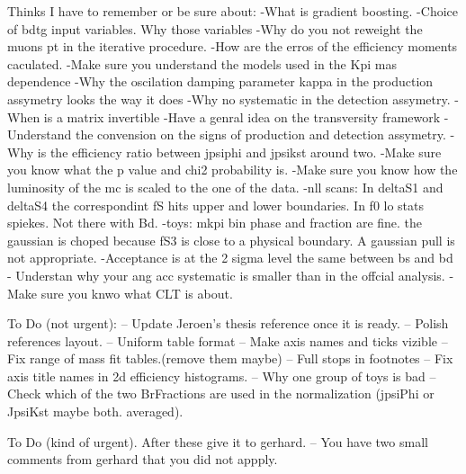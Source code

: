 
Thinks I have to remember or be sure about:
-What is gradient boosting.
-Choice of bdtg input variables. Why those variables
-Why do you not reweight the muons pt in the iterative procedure.
-How are the erros of the efficiency moments caculated.
-Make sure you understand the models used in the Kpi mas dependence
-Why the oscilation damping parameter kappa in the production assymetry looks the way it does 
-Why no systematic in the detection assymetry.
-When is a matrix invertible
-Have a genral idea on the transversity framework
-Understand the convension on the signs of production and detection assymetry.
-Why is the efficiency ratio between jpsiphi and jpsikst around two.
-Make sure you know what the p value and chi2 probability is.
-Make sure you know how the luminosity of the mc is scaled to the one of the data.
-nll scans: 
    In deltaS1 and deltaS4 the correspondint fS hits upper and lower boundaries.
    In f0 lo stats spiekes. Not there with Bd. 
-toys:
    mkpi bin phase and fraction are fine. the gaussian is choped because fS3 is close to a physical boundary. A gaussian pull is not appropriate.
-Acceptance is at the 2 sigma level the same between bs and bd
- Understan why your ang acc systematic is smaller than in the offcial analysis.
- Make sure you knwo what CLT is about.

To Do (not urgent):
-- Update Jeroen's thesis reference once it is ready.
-- Polish references layout.
-- Uniform table format
-- Make axis names and ticks vizible
-- Fix range of mass fit tables.(remove them maybe)
-- Full stops in footnotes
-- Fix axis title names in 2d efficiency histograms.
-- Why one group of toys is bad
-- Check which of the two BrFractions are used in the normalization (jpsiPhi or JpsiKst maybe both. averaged).

To Do (kind of urgent). After these give it to gerhard.
-- You have two small comments from gerhard that you did not appply.

